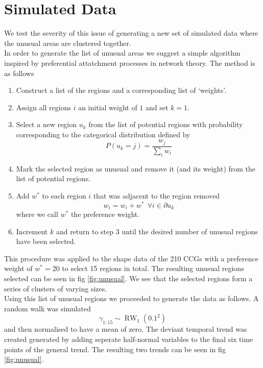 \documentclass[11pt]{report}
\begin{document}
\section{Simulated Data}

We test the severity of this issue of generating a new set of simulated data where the unusual areas are clustered together. \\

In order to generate the list of unusual areas we suggest a simple algorithm inspired by preferential attatchment processes in network theory. The method is as follows
\begin{enumerate}
\item Construct a list of the regions and a corresponding list of `weights'. 
\item Assign all regions $i$ an initial weight of $1$ and set $k=1$.
\item Select a new region $u_k$ from the list of potential regions with probability corresponding to the categorical distribution defined by
\begin{equation}
P(u_k = j) = \frac{w_j}{\sum_{i} w_i}
\end{equation}
\item Mark the selected region as unusual and remove it (and its weight) from the list of potential regions.
\item Add $w^*$ to each region $i$ that was adjacent to the region removed
\begin{equation}
w_i = w_i + w^* \ \ \forall i \in \partial u_k
\end{equation}
where we call $w^*$ the preference weight.
\item Increment $k$ and return to step 3 until the desired number of unusual regions have been selected. 
\end{enumerate}

This procedure was applied to the shape data of the 210 CCGs with a preference weight of $w^* = 20$ to select 15 regions in total. The resulting unusual regions selected can be seen in fig \ref{fig:unusual}. We see that the selected regions form a series of clusters of varying sizes. \\

Using this list of unusual regions we proceeded to generate the data as follows. A random walk was simulated
\begin{equation*}
\gamma_{1:15} \sim \operatorname{RW}_1(0.1^2)
\end{equation*}
and then normalised to have a mean of zero. The deviant temporal trend was created generated by adding seperate half-normal variables to the final six time points of the general trend. The resulting two trends can be seen in fig \ref{fig:unusual}. \\
\end{document}
